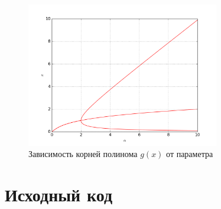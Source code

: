 \documentclass[a4paper]{article}
\begin{document}
\begin{figure}[ht]
	\center
  \includegraphics[width=0.75\textwidth]{../pictures/lab1_bifurcation.png}
  \caption{Зависимость корней полинома \(g(x)\) от параметра}
  \label{fig:roots2}
\end{figure}

\section{Исходный код}


\end{document}
